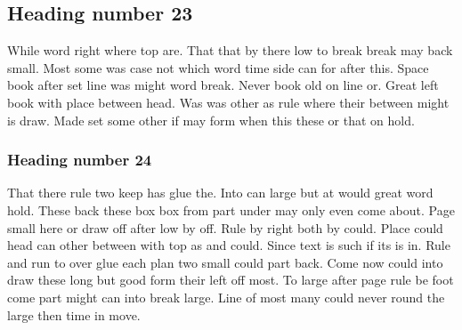 \documentclass[11pt]{report}
\begin{document}
\subsection{Heading number 23}

While word right where top are. That that by there low to break break may back small. Most some was case not which word time side can for after this. Space book after set line was might word break. Never book old on line or. Great left book with place between head. Was was other as rule where their between might is draw. Made set some other if may form when this these or that on hold.

\subsubsection{Heading number 24}

That there rule two keep has glue the. Into can large but at would great word hold. These back these box box from part under may only even come about. Page small here or draw off after low by off. Rule by right both by could. Place could head can other between with top as and could. Since text is such if its is in. Rule and run to over glue each plan two small could part back. Come now could into draw these long but good form their left off most. To large after page rule be foot come part might can into break large. Line of most many could never round the large then time in move.
\end{document}
